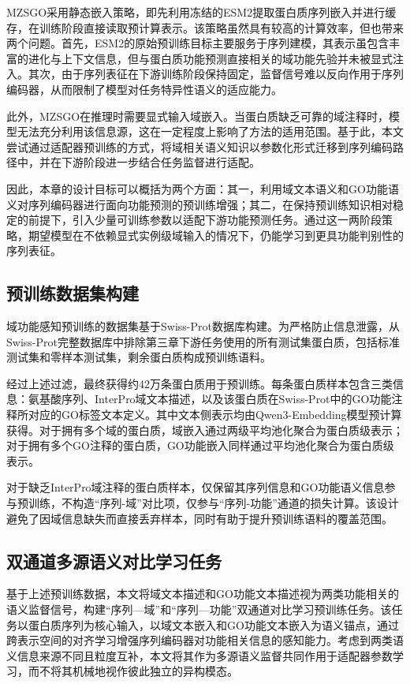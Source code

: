 MZSGO采用静态嵌入策略，即先利用冻结的ESM2提取蛋白质序列嵌入并进行缓存，在训练阶段直接读取预计算表示。该策略虽然具有较高的计算效率，但也带来两个问题。首先，ESM2的原始预训练目标主要服务于序列建模，其表示虽包含丰富的进化与上下文信息，但与蛋白质功能预测直接相关的域功能先验并未被显式注入。其次，由于序列表征在下游训练阶段保持固定，监督信号难以反向作用于序列编码器，从而限制了模型对任务特异性语义的适应能力。

此外，MZSGO在推理时需要显式输入域嵌入。当蛋白质缺乏可靠的域注释时，模型无法充分利用该信息源，这在一定程度上影响了方法的适用范围。基于此，本文尝试通过适配器预训练的方式，将域相关语义知识以参数化形式迁移到序列编码路径中，并在下游阶段进一步结合任务监督进行适配。

因此，本章的设计目标可以概括为两个方面：其一，利用域文本语义和GO功能语义对序列编码器进行面向功能预测的预训练增强；其二，在保持预训练知识相对稳定的前提下，引入少量可训练参数以适配下游功能预测任务。通过这一两阶段策略，期望模型在不依赖显式实例级域输入的情况下，仍能学习到更具功能判别性的序列表征。

\subsection{预训练数据集构建}

域功能感知预训练的数据集基于Swiss-Prot数据库构建。为严格防止信息泄露，从Swiss-Prot完整数据库中排除第三章下游任务使用的所有测试集蛋白质，包括标准测试集和零样本测试集，剩余蛋白质构成预训练语料。

经过上述过滤，最终获得约42万条蛋白质用于预训练。每条蛋白质样本包含三类信息：氨基酸序列、InterPro域文本描述，以及该蛋白质在Swiss-Prot中的GO功能注释所对应的GO标签文本定义。其中文本侧表示均由Qwen3-Embedding模型预计算获得。对于拥有多个域的蛋白质，域嵌入通过两级平均池化聚合为蛋白质级表示；对于拥有多个GO注释的蛋白质，GO功能嵌入同样通过平均池化聚合为蛋白质级表示。

对于缺乏InterPro域注释的蛋白质样本，仅保留其序列信息和GO功能语义信息参与预训练，不构造“序列-域”对比项，仅参与“序列-功能”通道的损失计算。该设计避免了因域信息缺失而直接丢弃样本，同时有助于提升预训练语料的覆盖范围。

\subsection{双通道多源语义对比学习任务}

基于上述预训练数据，本文将域文本描述和GO功能文本描述视为两类功能相关的语义监督信号，构建“序列—域”和“序列—功能”双通道对比学习预训练任务。该任务以蛋白质序列为核心输入，以域文本嵌入和GO功能文本嵌入为语义锚点，通过跨表示空间的对齐学习增强序列编码器对功能相关信息的感知能力。考虑到两类语义信息来源不同且粒度互补，本文将其作为多源语义监督共同作用于适配器参数学习，而不将其机械地视作彼此独立的异构模态。

